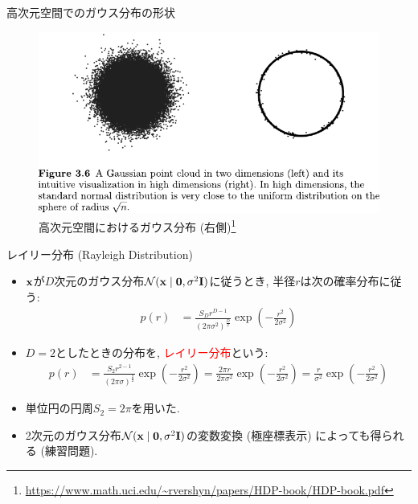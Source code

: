 \documentclass[dvipdfmx,notheorems,t]{beamer}
\begin{document}
\begin{frame}{高次元空間でのガウス分布の形状}
\begin{figure}
  \centering
  \includegraphics[keepaspectratio, width=0.9\linewidth]{fig/high-dimensional-gauss.pdf}
  \caption{高次元空間におけるガウス分布 (右側)\footnote{\url{https://www.math.uci.edu/~rvershyn/papers/HDP-book/HDP-book.pdf}}}
\end{figure}
\end{frame}

\begin{frame}{レイリー分布 (Rayleigh Distribution)}
\begin{itemize}
  \item $\vb{x}$が$D$次元のガウス分布$\mathcal{N}(\vb{x} \mid \vb{0}, \sigma^2 \vb{I})$に従うとき,
  半径$r$は次の確率分布に従う:
  \begin{align*}
    p(r) &= \frac{S_D r^{D - 1}}{(2\pi \sigma^2)^\frac{D}{2}} \exp(-\frac{r^2}{2 \sigma^2})
  \end{align*}

  \item $D = 2$としたときの分布を, \textcolor{red}{レイリー分布}という:
  \begin{align*}
    p(r) &= \frac{S_2 r^{2 - 1}}{(2\pi \sigma)^\frac{2}{2}} \exp(-\frac{r^2}{2\sigma^2})
      = \frac{2\pi r}{2\pi \sigma^2} \exp(-\frac{r^2}{2\sigma^2})
      = \frac{r}{\sigma^2} \exp(-\frac{r^2}{2\sigma^2})
  \end{align*}

  \item 単位円の円周$S_2 = 2\pi$を用いた.
  \item 2次元のガウス分布$\mathcal{N}(\vb{x} \mid \vb{0}, \sigma^2 \vb{I})$の変数変換 (極座標表示) によっても得られる (練習問題).
\end{itemize}
\end{frame}
\end{document}
